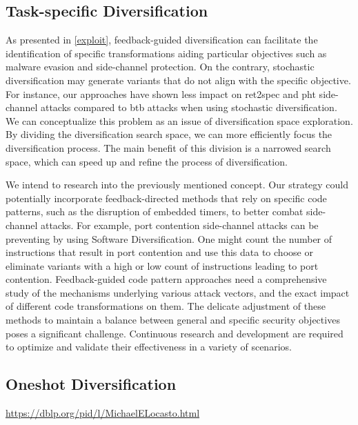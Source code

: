 \subsection{Task-specific Diversification}
As presented in \autoref{exploit}, feedback-guided diversification can facilitate the identification of specific transformations aiding particular objectives such as malware evasion and side-channel protection. 
On the contrary, stochastic diversification may generate variants that do not align with the specific objective. 
For instance, our approaches have shown less impact on ret2spec and pht side-channel attacks compared to btb attacks when using stochastic diversification.
We can conceptualize this problem as an issue of diversification space exploration. 
By dividing the diversification search space, we can more efficiently focus the diversification process. 
The main benefit of this division is a narrowed search space, which can speed up and refine the process of diversification. 


We intend to research into the previously mentioned concept. 
Our strategy could potentially incorporate feedback-directed methods that rely on specific code patterns, such as the disruption of embedded timers, to better combat side-channel attacks. 
For example, port contention side-channel \cite{10.1145/3488932.3517411} attacks can be preventing by using Software Diversification. 
One might count the number of instructions that result in port contention and use this data to choose or eliminate variants with a high or low count of instructions leading to port contention.
Feedback-guided code pattern approaches need a comprehensive study of the mechanisms underlying various attack vectors, and the exact impact of different code transformations on them. 
The delicate adjustment of these methods to maintain a balance between general and specific security objectives poses a significant challenge. 
Continuous research and development are required to optimize and validate their effectiveness in a variety of scenarios.


\subsection{Oneshot Diversification}
\url{https://dblp.org/pid/l/MichaelELocasto.html}
